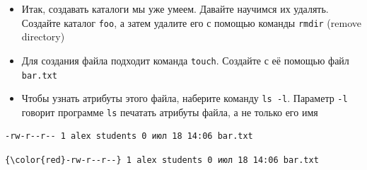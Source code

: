 \documentclass{beamer}
\begin{document}
\begin{frame}[fragile]
	\begin{itemize}
		\item{Итак, создавать каталоги мы уже умеем. Давайте научимся их удалять. Создайте каталог \texttt{foo}, а затем удалите его с помощью команды \texttt{rmdir} (remove directory)}\pause
		\item{Для создания файла подходит команда \texttt{touch}. Создайте с её помощью файл \texttt{bar.txt}}\pause
		\item{Чтобы узнать атрибуты этого файла, наберите команду \texttt{ls~-l}. Параметр \texttt{-l} говорит программе \texttt{ls} печатать атрибуты файла, а не только его имя}
	\end{itemize}
{
	\begin{Verbatim}[commandchars=\\\{\},codes={\catcode`$=3\catcode`^=7\catcode`_=8}]
-rw-r--r-- 1 alex students 0 июл 18 14:06 bar.txt
	\end{Verbatim}}
{
	\begin{Verbatim}[commandchars=\\\{\},codes={\catcode`$=3\catcode`^=7\catcode`_=8}]
{\color{red}-rw-r--r--} 1 alex students 0 июл 18 14:06 bar.txt
	\end{Verbatim}}
\end{frame}
\end{document}
